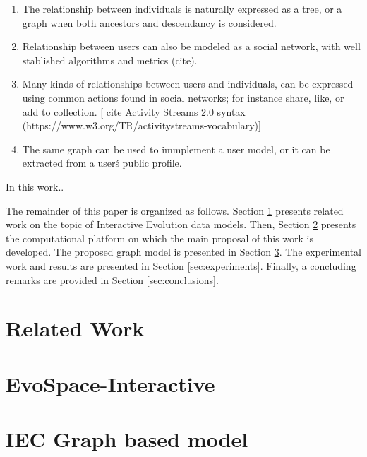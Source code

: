 \documentclass[conference]{IEEEtran}
\begin{document}
\begin{enumerate}
  \item  The relationship between individuals is naturally expressed as a
  tree, or a graph when both ancestors and descendancy is considered. 

  \item Relationship between users can also be modeled as a social network,
  with well stablished algorithms and metrics (cite).

  \item Many kinds of relationships between users and individuals,
  can be expressed using common actions found in social networks;
  for instance share, like, or add to collection. [ cite Activity Streams 2.0
  syntax (https://www.w3.org/TR/activitystreams-vocabulary)]   

  \item The same graph can be used to immplement a user model, or it can
  be extracted from a user\'s public profile.

\end{enumerate}

In this work..


The remainder of this paper is organized  as follows.
Section \ref{sec:interactive} presents related work on the topic 
of Interactive Evolution data models.
Then, Section \ref{sec:evospace-i} presents the computational platform on which 
the main proposal of this work is developed. The proposed graph model is 
presented in Section \ref{sec:graph}.
The experimental work and results are presented in Section \ref{sec:experiments}.
Finally, a concluding remarks are provided in Section \ref{sec:conclusions}.


\section{Related Work}
\label{sec:interactive}

\section{EvoSpace-Interactive}
\label{sec:evospace-i} 

\section{IEC Graph based model}
\label{sec:graph}
\end{document}
